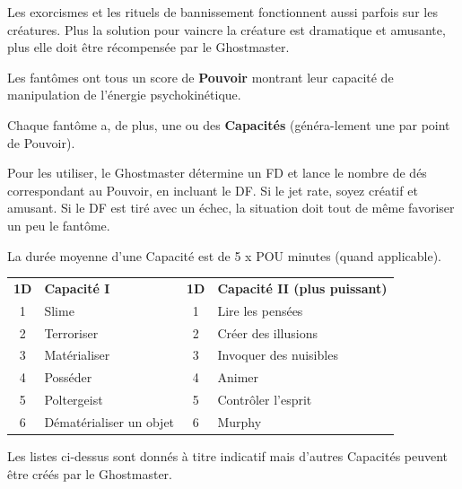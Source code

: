 \begin{frame}[b]
{\begin{minipage}[c][0.95\textheight][c]{\linewidth}

\myindent Les exorcismes et les rituels de bannissement fonctionnent aussi parfois sur les créatures. Plus la solution pour vaincre la créature est dramatique et amusante, plus elle doit être récompensée par le Ghostmaster.


\myindent Les fantômes ont tous un score de \textbf{Pouvoir} montrant leur capacité de manipulation de l'énergie psychokinétique.

\myindent Chaque fantôme a, de plus, une ou des \textbf{Capacités} (généra-lement une par point de Pouvoir).

\myindent Pour les utiliser, le Ghostmaster détermine un FD et lance le nombre de dés correspondant au Pouvoir, en incluant le DF. Si le jet rate, soyez créatif et amusant. Si le DF est tiré avec un échec, la situation doit tout de même favoriser un peu le fantôme.

\myindent La durée moyenne d'une Capacité est de 5 x POU minutes (quand applicable).

\begin{center}
\begin{tabular}{clcl}
\textbf{1D} & \textbf{Capacité I} & \textbf{1D} & \textbf{Capacité II (plus puissant)} \\
1 & Slime & 1 & Lire les pensées \\
2 & Terroriser & 2 & Créer des illusions \\
3 & Matérialiser & 3 & Invoquer des nuisibles \\
4 & Posséder & 4 & Animer \\
5 & Poltergeist & 5 & Contrôler l'esprit \\
6 & Dématérialiser un objet & 6 & Murphy \\
\end{tabular}
\end{center}

\myindent Les listes ci-dessus sont donnés à titre indicatif mais d'autres Capacités peuvent être créés par le Ghostmaster.


\end{minipage}}
\end{frame}
